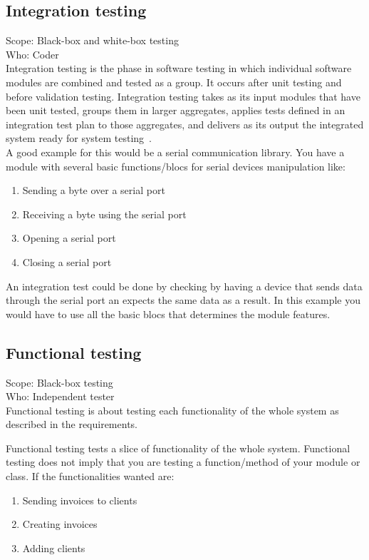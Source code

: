 \documentclass[12pt]{article}
\theoremstyle{definition}
\theoremstyle{definition}
\theoremstyle{remark}
\begin{document}
\subsection{Integration testing}

Scope: Black-box and white-box testing\\
Who: Coder\\

Integration testing is the phase in software testing in which individual software modules are combined and tested as a group. It occurs after unit testing and before validation testing. Integration testing takes as its input modules that have been unit tested, groups them in larger aggregates, applies tests defined in an integration test plan to those aggregates, and delivers as its output the integrated system ready for system testing~\cite{TestingInSoftwareDevelopment:1987}.\\

A good example for this would be a serial communication library. You have a module with several basic functions/blocs for serial devices manipulation like:
\begin{enumerate}
\item Sending a byte over a serial port
\item Receiving a byte using the serial port
\item Opening a serial port
\item Closing a serial port
\end{enumerate}

An integration test could be done by checking by having a device that sends data through the serial port an expects the same data as a result. In this example you would have to use all the basic blocs that determines the module features.


\subsection{Functional testing}

Scope: Black-box testing\\
Who: Independent tester\\

Functional testing is about testing each functionality of the whole system as described in the requirements.

Functional testing tests a slice of functionality of the whole system. Functional testing does not imply that you are testing a function/method of your module or class. If the functionalities wanted are:
\begin{enumerate}
\item Sending invoices to clients
\item Creating invoices
\item Adding clients
\end{enumerate}
\end{document}

